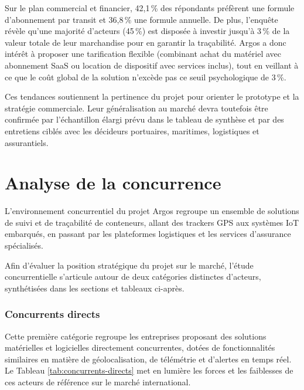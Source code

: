 Sur le plan commercial et financier, 42,1\,\% des répondants préfèrent une formule d'abonnement par transit et 36,8\,\% une formule annuelle. De plus, l'enquête révèle qu'une majorité d'acteurs (45\,\%) est disposée à investir jusqu'à 3\,\% de la valeur totale de leur marchandise pour en garantir la traçabilité. Argos a donc intérêt à proposer une tarification flexible (combinant achat du matériel avec abonnement SaaS ou location de dispositif avec services inclus), tout en veillant à ce que le coût global de la solution n'excède pas ce seuil psychologique de 3\,\%.

Ces tendances soutiennent la pertinence du projet pour orienter le prototype et la stratégie commerciale. Leur généralisation au marché devra toutefois être confirmée par l’échantillon élargi prévu dans le tableau de synthèse et par des entretiens ciblés avec les décideurs portuaires, maritimes, logistiques et assurantiels.
\section{Analyse de la concurrence}

L'environnement concurrentiel du projet Argos regroupe un ensemble de solutions de suivi et de traçabilité de conteneurs, allant des trackers GPS aux systèmes IoT embarqués, en passant par les plateformes logistiques et les services d'assurance spécialisés. 

Afin d'évaluer la position stratégique du projet sur le marché, l'étude concurrentielle s'articule autour de deux catégories distinctes d'acteurs, synthétisées dans les sections et tableaux ci-après.

\subsubsection{Concurrents directs} 

\indent Cette première catégorie regroupe les entreprises proposant des solutions matérielles et logicielles directement concurrentes, dotées de fonctionnalités similaires en matière de géolocalisation, de télémétrie et d'alertes en temps réel. Le Tableau \ref{tab:concurrents-directs} met en lumière les forces et les faiblesses de ces acteurs de référence sur le marché international.


